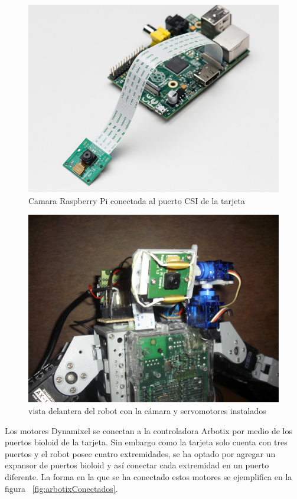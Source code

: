 \begin{figure}[hbtp]
\centering
\includegraphics[scale=1]{imagenes/raspbCam.jpg}
\caption{Camara Raspberry Pi conectada al puerto CSI de la tarjeta}
\label{fig:camACSI}
\end{figure}
 
\begin{figure}[hbtp]
\centering
\includegraphics[scale=0.1]{imagenes/servosYcamara.JPG}
\caption{vista delantera del robot con la cámara y servomotores instalados}
\label{fig:servosycam}
\end{figure}

Los motores Dynamixel se conectan a la controladora Arbotix por medio de los puertos bioloid de la tarjeta. Sin embargo como la tarjeta solo cuenta con tres puertos y el robot posee cuatro extremidades, se ha optado por agregar un expansor de puertos bioloid y así conectar cada extremidad en un puerto diferente. La forma en la que se ha conectado estos motores se ejemplifica en 
la figura ~\ref{fig:arbotixConectados}. 

